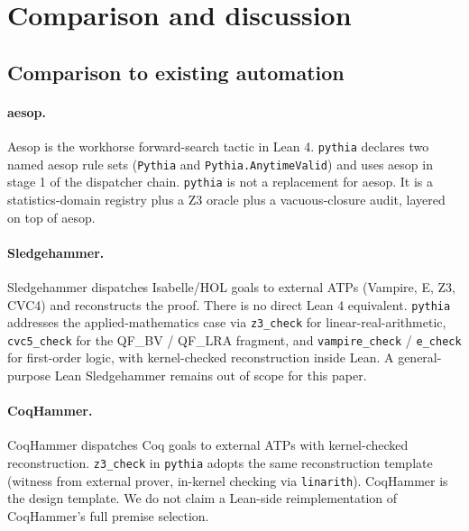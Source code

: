 \section{Comparison and discussion}
\label{sec:discussion}

\subsection{Comparison to existing automation}
\label{sec:discussion-comparison}

\paragraph{aesop.}
Aesop \citep{aesop2023} is the workhorse forward-search tactic in
Lean 4. \texttt{pythia} declares two named aesop rule sets
(\texttt{Pythia} and \texttt{Pythia.AnytimeValid}) and uses aesop in
stage 1 of the dispatcher chain. \texttt{pythia} is not a replacement
for aesop. It is a statistics-domain registry plus a Z3 oracle plus a
vacuous-closure audit, layered on top of aesop.

\paragraph{Sledgehammer.}
Sledgehammer \citep{paulsonblanchette2010threeyears,
blanchettesledgehammer2011} dispatches Isabelle/HOL goals to
external ATPs (Vampire, E, Z3, CVC4) and reconstructs the proof.
There is no direct Lean 4 equivalent. \texttt{pythia} addresses
the applied-mathematics case via \texttt{z3\_check} for
linear-real-arithmetic, \texttt{cvc5\_check} for the QF\_BV /
QF\_LRA fragment, and \texttt{vampire\_check} / \texttt{e\_check}
for first-order logic, with kernel-checked reconstruction inside
Lean. A general-purpose Lean Sledgehammer remains out of scope
for this paper.

\paragraph{CoqHammer.}
CoqHammer \citep{czajkakaliszyk2018coqhammer} dispatches Coq goals
to external ATPs with kernel-checked reconstruction. \texttt{z3\_check}
in \texttt{pythia} adopts the same reconstruction template
(witness from external prover, in-kernel checking via
\texttt{linarith}). CoqHammer is the design template. We do not
claim a Lean-side reimplementation of CoqHammer's full premise
selection.

